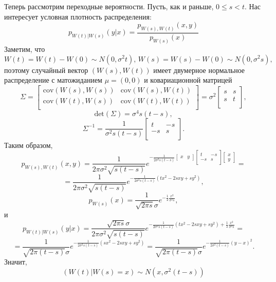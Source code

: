 \documentclass{article}
\theoremstyle{definition}
\begin{document}
Теперь рассмотрим переходные вероятности. Пусть, как и раньше, $0 \leqslant s < t$. Нас интересует условная плотность распределения:
$$p_{W(t)|W(s)}(y|x) = \frac{p_{W(s),W(t)}(x,y)}{p_{W(s)}(x)}$$
Заметим, что 
$$W(t) = W(t) - W(0) \sim N(0, \sigma^2t),\, W(s) = W(s) - W(0) \sim N(0, \sigma^2s),$$
поэтому случайный вектор $(W(s), W(t))$ имеет двумерное нормальное распределение с матожиданием $\mu = (0, 0)$ и ковариационной матрицей
$$\Sigma = \begin{bmatrix}
\text{cov}(W(s), W(s)) & \text{cov}(W(s), W(t))\\
\text{cov}(W(t), W(s)) & \text{cov}(W(t), W(t))\\
\end{bmatrix} = \sigma^2\begin{bmatrix}
s & s\\
s & t\\
\end{bmatrix},$$
$$\text{det}(\Sigma) = \sigma^4s(t-s),$$
$$\Sigma^{-1} = \frac{1}{\sigma^2s(t-s)}\begin{bmatrix}
t & -s\\
-s & s\\
\end{bmatrix}.$$
Таким образом,
$$
p_{W(s), W(t)}(x, y) = \frac{1}{2\pi \sigma^2 \sqrt{s(t-s)}}e^{-\frac{1}{2\sigma^2s(t-s)}\begin{bmatrix}x & y\end{bmatrix}\begin{bmatrix}
t & -s\\
-s & s\\
\end{bmatrix}\begin{bmatrix}x \\ y\end{bmatrix}} = $$
$$
 = \frac{1}{2\pi \sigma^2 \sqrt{s(t-s)}}e^{-\frac{1}{2\sigma^2s(t-s)}(tx^2 - 2sxy + sy^2)},
$$
$$p_{W(s)}(x) = \frac{1}{\sqrt{2\pi s}\sigma}e^{-\frac{1}{2}\frac{x^2}{\sigma^2s}},$$
и
$$
p_{W(t)|W(s)}(y|x) = \frac{\sqrt{2\pi s}\sigma}{2\pi \sigma^2 \sqrt{s(t-s)}}e^{-\frac{1}{2\sigma^2s(t-s)}(tx^2 - 2sxy + sy^2) + \frac{1}{2}\frac{x^2}{\sigma^2s}} = 
$$
$$ = \frac{1}{\sqrt{2\pi(t-s)} \sigma}e^{-\frac{1}{2\sigma^2s(t-s)}(sx^2 - 2sxy + sy^2)} = 
\frac{1}{\sqrt{2\pi(t-s)} \sigma}e^{-\frac{1}{2\sigma^2(t-s)}(y - x)^2}.
$$
Значит, 
$$(W(t)|W(s)=x) \sim N(x, \sigma^2(t - s))$$
\end{document}
